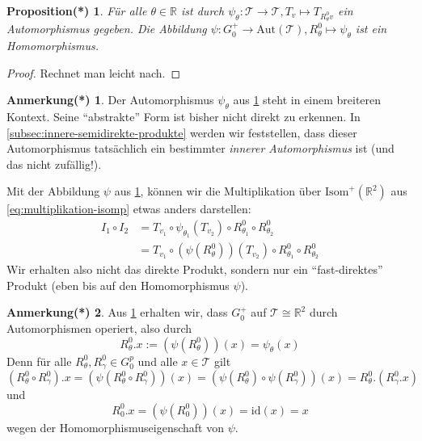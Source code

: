 \documentclass[a4paper, ngerman]{article}
\newcounter{chapter}
\numberwithin{equation}{chapter}
\theoremstyle{plain}
\newtheorem{propositionstrd}{Proposition(*)}[chapter]
\theoremstyle{definition}
\newtheorem{annotationstrd}{Anmerkung(*)}[chapter]
\newcommand{\id}{\ensuremath{\text{id}}}
\newcommand{\geradisometr}{\ensuremath{\mathrm{Isom}^+(\mathbb R^2)}}
\newcommand{\anm}[1]{{\color{red} #1}}
\begin{document}
\begin{propositionstrd}\label{prop*:wirkung-auf-translationen}
    Für alle \(\theta \in \mathbb R\) ist durch \(\psi_\theta: \mathcal T \to \mathcal T, T_v \mapsto T_{R_\theta^0 v}\) ein Automorphismus gegeben. Die Abbildung \(\psi:G_0^+\to \mathrm{Aut}(\mathcal T), R_\theta^0 \mapsto \psi_\theta\) ist ein Homomorphismus. 
\end{propositionstrd}
\begin{proof}
    Rechnet man leicht nach.%
\end{proof}
\begin{annotationstrd}\label{ann*:breiterer-kontext-für-automorphismus}
    Der Automorphismus \(\psi_\theta\) aus \cref{prop*:wirkung-auf-translationen} steht in einem breiteren Kontext. Seine "`abstrakte"' Form ist bisher nicht direkt zu erkennen. In \cref{subsec:innere-semidirekte-produkte} werden wir feststellen, dass dieser Automorphismus tatsächlich ein bestimmter \textit{innerer Automorphismus} ist (und das nicht zufällig!). 
\end{annotationstrd}
Mit der Abbildung \(\psi\) aus \cref{prop*:wirkung-auf-translationen}, können wir die Multiplikation über \(\geradisometr\) aus \eqref{eq:multiplikation-isomp} etwas anders darstellen: 
\begin{align*}
    I_1\circ I_2 &= T_{v_1} \circ \psi_{\theta_1}(T_{v_2})\circ R_{\theta_1}^0\circ R_{\theta_2}^0 \\
    &= T_{v_1} \circ (\psi(R_\theta^0))(T_{v_2})\circ R_{\theta_1}^0\circ R_{\theta_2}^0
\end{align*}
Wir erhalten also nicht das direkte Produkt, sondern nur ein "`fast-direktes"' Produkt (eben bis auf den Homomorphismus \(\psi\)). 

\begin{annotationstrd}
    Aus \cref{prop*:wirkung-auf-translationen} erhalten wir, dass \(G_0^+\) auf \(\mathcal T\cong \mathbb R^2\) durch Automorphismen operiert, also durch 
    \begin{equation*}
        R_\theta^0.x := (\psi(R_\theta^0))(x) = \psi_\theta(x)
    \end{equation*}
    Denn für alle \(R_\theta^0, R_\gamma^0 \in G_0^p\) und alle \(x \in \mathcal T\) gilt
    \begin{equation*}
        (R_\theta^0 \circ R_\gamma^0).x = (\psi(R_\theta^0\circ R_\gamma^0))(x) = (\psi(R_\theta^0)\circ \psi(R_\gamma^0))(x) = R_\theta^0.(R_\gamma^0.x)
    \end{equation*} 
    und
    \begin{equation*}
        R_0^0.x = (\psi(R_0^0))(x) = \id(x) = x
    \end{equation*}
    wegen der Homomorphismuseigenschaft von \(\psi\). 
\end{annotationstrd}
\end{document}
